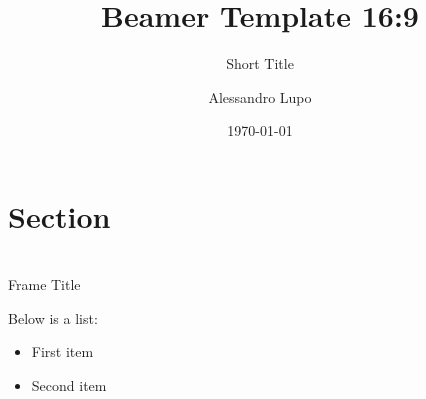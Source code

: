 \documentclass[aspectratio=169]{beamer}
\title{Beamer Template 16:9}
\subtitle{Short Title}
\author{Alessandro Lupo}
\date{\today}
\begin{document}
	
	\begin{frame}[plain]
		\titlepage
	\end{frame}
	
	\section{Section}
	
	
	
	
	\section{ }
	\begin{frame}[t]{Frame Title}

		Below is a list:
		\begin{itemize}
			\item First item
			\item Second item
		\end{itemize}
	\end{frame}
	
	
\end{document}

